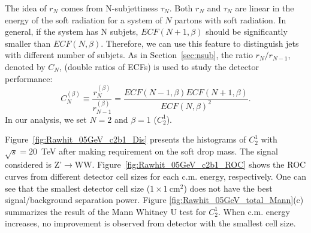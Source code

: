 The idea of $r_N$ comes from N-subjettiness $\tau_N$. Both $r_N$ and $\tau_N$ 
are linear in the energy of the soft radiation for a system of $N$ partons 
with soft radiation. In general, if the system has N subjets, $ECF(N+1,\beta)$ 
should be significantly smaller than $ECF(N,\beta)$. Therefore, we can use this
 feature to distinguish jets with different number of subjets. 
As in Section~\ref{sec:nsub}, the ratio $r_N/r_{N-1}$, denoted by $C_N$, 
(double ratios of ECFs) is used to study the detector performance: 
\begin{equation}
C_{N}^{(\beta)}\equiv\frac{r_{N}^{(\beta)}}{r_{N-1}^{(\beta)}}=\frac{ECF(N-1,\beta)ECF(N+1,\beta)}{ECF(N,\beta)^2}.
\end{equation}
In our analysis, we set $N=2$ and $\beta=1$ ($C_2^1$).

Figure~\ref{fig:Rawhit_05GeV_c2b1_Dis} presents the histograms of $C_{2}^{1}$ 
with $\sqrt{s}=20$~TeV after making requirement on the soft drop mass. 
The signal considered is Z'$\rightarrow$WW. 
Figure~\ref{fig:Rawhit_05GeV_c2b1_ROC} shows the ROC curves from different 
detector cell sizes for each c.m. energy, respectively. One can see that 
the smallest detector cell size ($1\times1~\mathrm{cm}^2$) does not have the 
best signal/background separation power. 
Figure \ref{fig:Rawhit_05GeV_total_Mann}(c) summarizes the result of 
the Mann Whitney U test for $C_{2}^{1}$. When c.m. energy increases, 
no improvement is observed from detector with the smallest cell size. 



